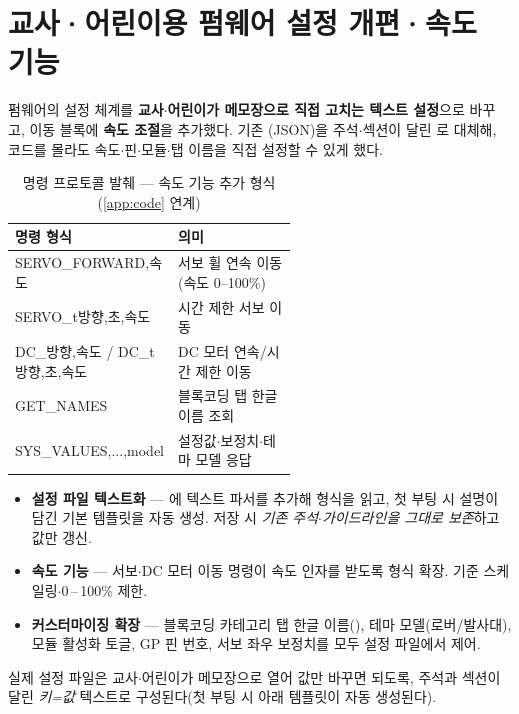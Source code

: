 \section{교사·어린이용 펌웨어 설정 개편·속도 기능}
펌웨어의 설정 체계를 \textbf{교사$\cdot$어린이가 메모장으로 직접 고치는 텍스트
설정}으로 바꾸고, 이동 블록에 \textbf{속도 조절}을 추가했다. 기존 (JSON)을
주석$\cdot$섹션이 달린 로 대체해, 코드를 몰라도
속도$\cdot$핀$\cdot$모듈$\cdot$탭 이름을 직접 설정할 수 있게 했다.

\begin{table}[htbp]\centering\small
\caption{명령 프로토콜 발췌 — 속도 기능 추가 형식 (\ref{app:code} 연계)}
\renewcommand{\arraystretch}{1.2}
\begin{tabularx}{\linewidth}{@{}>{\ttfamily\footnotesize}l L{0.56\linewidth}@{}}
\toprule
\sffamily 명령 형식 & \sffamily 의미 \\
\midrule
SERVO\_FORWARD,속도        & 서보 휠 연속 이동(속도 0--100\%) \\
SERVO\_t방향,초,속도        & 시간 제한 서보 이동 \\
DC\_방향,속도 / DC\_t방향,초,속도 & DC 모터 연속/시간 제한 이동 \\
GET\_NAMES                 & 블록코딩 탭 한글 이름 조회 \\
SYS\_VALUES,...,model      & 설정값$\cdot$보정치$\cdot$테마 모델 응답 \\
\bottomrule
\end{tabularx}
\end{table}

\begin{itemize}
  \item \textbf{설정 파일 텍스트화} — 에 텍스트 파서를 추가해
   형식을 읽고, 첫 부팅 시 설명이 담긴 기본 템플릿을 자동 생성.
  저장 시 \emph{기존 주석$\cdot$가이드라인을 그대로 보존}하고 값만 갱신.
  \item \textbf{속도 기능} — 서보$\cdot$DC 모터 이동 명령이 속도 인자를 받도록 형식 확장.
   기준 스케일링$\cdot$0\,--\,100\% 제한.
  \item \textbf{커스터마이징 확장} — 블록코딩 카테고리 탭 한글 이름(),
  테마 모델(로버/발사대), 모듈 활성화 토글, GP 핀 번호, 서보 좌우 보정치를 모두
  설정 파일에서 제어.
\end{itemize}

\noindent 실제 설정 파일은 교사$\cdot$어린이가 메모장으로 열어 값만 바꾸면 되도록,
주석과 섹션이 달린 \emph{키=값} 텍스트로 구성된다(첫 부팅 시 아래 템플릿이 자동 생성된다).

